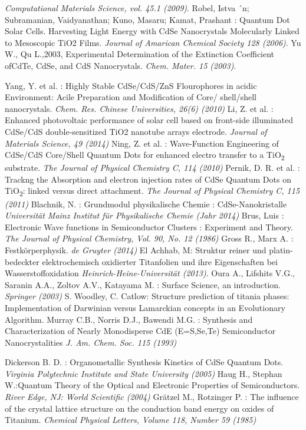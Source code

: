 \documentclass[12pt]{article}
\begin{document}
\begin{thebibliography}{}
						{\sl Computational Materials Science, vol. 45.1 (2009)}.
 Robel, Istva ´n; Subramanian, Vaidyanathan; Kuno, Masaru; Kamat, Prashant : Quantum Dot Solar Cells. Harvesting Light Energy with CdSe Nanocrystals Molecularly Linked to Mesoscopic TiO2 Films.
						{\sl Journal of Amarican Chemical Society 128 (2006)}.
 Yu W., Qu L.,2003, Experimental Determination of the Extinction Coefficient ofCdTe, CdSe, and CdS Nanocrystals.
						{\sl Chem. Mater. 15 (2003)}.

Yang, Y. et al. : Highly Stable CdSe/CdS/ZnS Flourophores in acidic Environment: Acile Preparation and Modification of Core/																	shell/shell nanocrystals. {\sl Chem. Res. Chinese Universities, 26(6) (2010)}
Li, Z. et al. : Enhanced photovoltaic performance of solar cell based on front-side illuminated CdSe/CdS double-sensitized TiO2 nanotube arrays electrode.						{\sl Journal of Materials Science, 49 (2014)}
Ning, Z. et al. : Wave-Function Engineering of CdSe/CdS Core/Shell Quantum Dots for enhanced electro transfer to a TiO\textsubscript{2} substrate.						{\sl The Journal of Physical Chemistry C, 114 (2010)}
Pernik, D. R. et al. : Trackng the Absorption and electron injection rates of CdSe Quantum Dots on TiO\textsubscript{2}: linked versus direct attachment. {\sl The Journal of Physical Chemistry C, 115 (2011)}
 Blachnik, N. : Grundmodul physikalische Chemie : CdSe-Nanokristalle {\sl Universität Mainz
						Institut für Physikalische Chemie (Jahr 2014)}
Brus, Luis : Electronic Wave functions in Semiconductor Clusters : Experiment and Theory.
						{\sl The Journal of Physical Chemistry, Vol. 90, No. 12 (1986)}
 Gross R., Marx A. : Festkörperphysik. {\sl de Gruyter (2014)}
El Achhab, M: Struktur reiner und platin-bedeckter elektrochemisch oxidierter Titanfolien und ihre Eigenschaften bei Wasserstoffoxidation {\sl Heinrich-Heine-Universität (2013)}.
 Oura A., Lifshits V.G., Saranin A.A., Zoltov A.V., Katayama M. : Surface Science, an introduction.
						{\sl Springer (2003)}
 S. Woodley, C. Catlow: Structure prediction of titania phases: Implementation of Darwinian versus Lamarckian concepts in an Evolutionary Algorithm.
 Murray C.B., Norris D.J., Bawendi M.G. : Synthesis and Characterization of Nearly Monodisperse CdE (E=S,Se,Te) Semiconductor Nanocrystalities {\sl J. Am. Chem. Soc. 115 (1993)}

 Dickerson B. D. : Organometallic Synthesis Kinetics of CdSe Quantum Dots.   
						{\sl Virginia Polytechnic Institute and State University (2005)}
Haug H., Stephan W.:Quantum Theory of the Optical and  Electronic Properties of Semiconductors.
						{\sl River Edge, NJ: World Scientific (2004)}
Grätzel M.,  Rotzinger P. : The influence of the crystal lattice structure on the conduction band energy on oxides of Titanium. 
						{\sl Chemical Physical Letters, Volume 118, Number 59 (1985)}

 



\end{thebibliography}
\end{document}
